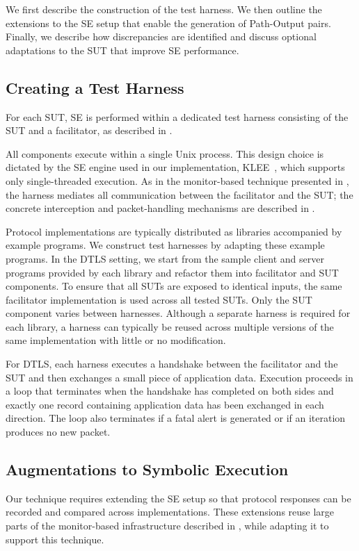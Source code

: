 We first describe the construction of the test harness.
We then outline the extensions to the SE setup that enable the generation of Path-Output pairs.
Finally, we describe how discrepancies are identified and discuss optional adaptations to the SUT that improve SE performance.

\subsection{Creating a Test Harness}
For each SUT, SE is performed within a dedicated test harness consisting of the SUT and a facilitator, as described in .

All components execute within a single Unix process.
This design choice is dictated by the SE engine used in our implementation, KLEE~\cite{KLEE@OSDI-08}, which supports only single-threaded execution.
As in the monitor-based technique presented in , the harness mediates all communication between the facilitator and the SUT; the concrete interception and packet-handling mechanisms are described in .

Protocol implementations are typically distributed as libraries accompanied by example programs.
We construct test harnesses by adapting these example programs.
In the DTLS setting, we start from the sample client and server programs provided by each library and refactor them into facilitator and SUT components.
To ensure that all SUTs are exposed to identical inputs, the same facilitator implementation is used across all tested SUTs.
Only the SUT component varies between harnesses.
Although a separate harness is required for each library, a harness can typically be reused across multiple versions of the same implementation with little or no modification.

For DTLS, each harness executes a handshake between the facilitator and the SUT and then exchanges a small piece of application data.
Execution proceeds in a loop that terminates when the handshake has completed on both sides and exactly one record containing application data has been exchanged in each direction. 
The loop also terminates if a fatal alert is generated or if an iteration produces no new packet.

\subsection{Augmentations to Symbolic Execution}
Our technique requires extending the SE setup so that protocol responses can be recorded and compared across implementations.
These extensions reuse large parts of the monitor-based infrastructure described in , while adapting it to support this technique.

